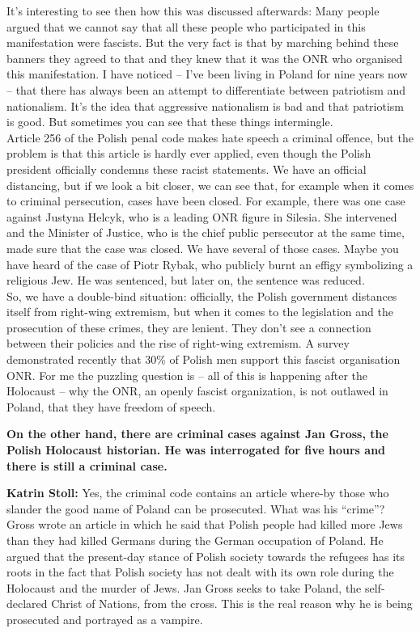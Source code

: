 It’s interesting to see then how this was discussed afterwards: Many people argued that we cannot say that all these people who participated in this manifestation were fascists. But the very fact is that by marching behind these banners they agreed to that and they knew that it was the ONR who organised this manifestation. I have noticed – I’ve been living in Poland for nine years now – that there has always been an attempt to differentiate between patriotism and nationalism. It’s the idea that aggressive nationalism is bad and that patriotism is good. But sometimes you can see that these things intermingle.\\ 
Article 256 of the Polish penal code makes hate speech a criminal offence, but the problem is that this article is hardly ever applied, even though the Polish president officially condemns these racist statements. We have an official distancing, but if we look a bit closer, we can see that, for example when it comes to criminal persecution, cases have been closed. For example, there was one case against Justyna Helcyk, who is a leading ONR figure in Silesia. She intervened and the Minister of Justice, who is the chief public persecutor at the same time, made sure that the case was closed. We have several of those cases. Maybe you have heard of the case of Piotr Rybak, who publicly burnt an effigy symbolizing a religious Jew. He was sentenced, but later on, the sentence was reduced.\\ 
So, we have a double-bind situation: officially, the Polish government distances itself from right-wing extremism, but when it comes to the legislation and the prosecution of these crimes, they are lenient. They don’t see a connection between their policies and the rise of right-wing extremism. A survey demonstrated recently that 30\% of Polish men support this fascist organisation ONR. For me the puzzling question is – all of this is happening after the Holocaust – why the ONR, an openly fascist organization, is not outlawed in Poland, that they have freedom of speech.  

\textbf{On the other hand, there are criminal cases against Jan Gross, the Polish Holocaust historian. He was interrogated for five hours and there is still a criminal case.} 

\textbf{Katrin Stoll:} Yes, the criminal code contains an article where-by those who slander the good name of Poland can be prosecuted. What was his ``crime''? Gross wrote an article in which he said that Polish people had killed more Jews than they had killed Germans during the German occupation of Poland. He argued that the present-day stance of Polish society towards the refugees has its roots in the fact that Polish society has not dealt with its own role during the Holocaust and the murder of Jews. Jan Gross seeks to take Poland, the self-declared Christ of Nations, from the cross. This is the real reason why he is being prosecuted and portrayed as a vampire.  

